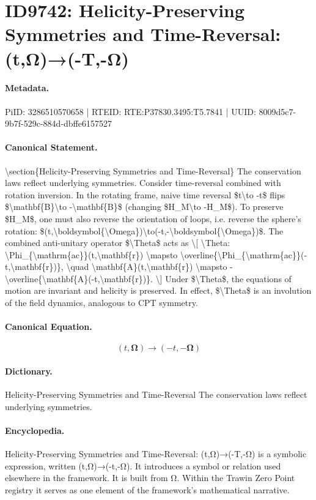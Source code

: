 \section*{ID9742: Helicity-Preserving Symmetries and Time-Reversal: (t,Ω)→(-T,-Ω)}
\paragraph{Metadata.}
PiID: 3286510570658 | RTEID: RTE:P37830.3495:T5.7841 | UUID: 8009d5c7-9b7f-529c-884d-dbffe6157527

\paragraph{Canonical Statement.}
\textbackslash{}section\{Helicity-Preserving Symmetries and Time-Reversal\} The conservation laws reflect underlying symmetries. Consider time-reversal combined with rotation inversion. In the rotating frame, naive time reversal \$t\textbackslash{}to -t\$ flips \$\textbackslash{}mathbf\{B\}\textbackslash{}to -\textbackslash{}mathbf\{B\}\$ (changing \$H\_M\textbackslash{}to -H\_M\$). To preserve \$H\_M\$, one must also reverse the orientation of loops, i.e. reverse the sphere's rotation: \$(t,\textbackslash{}boldsymbol\{\textbackslash{}Omega\})\textbackslash{}to(-t,-\textbackslash{}boldsymbol\{\textbackslash{}Omega\})\$. The combined anti-unitary operator \$\textbackslash{}Theta\$ acts as \textbackslash{}[ \textbackslash{}Theta: \textbackslash{}Phi\_\{\textbackslash{}mathrm\{ac\}\}(t,\textbackslash{}mathbf\{r\}) \textbackslash{}mapsto \textbackslash{}overline\{\textbackslash{}Phi\_\{\textbackslash{}mathrm\{ac\}\}(-t,\textbackslash{}mathbf\{r\})\}, \textbackslash{}quad \textbackslash{}mathbf\{A\}(t,\textbackslash{}mathbf\{r\}) \textbackslash{}mapsto -\textbackslash{}overline\{\textbackslash{}mathbf\{A\}(-t,\textbackslash{}mathbf\{r\})\}. \textbackslash{}] Under \$\textbackslash{}Theta\$, the equations of motion are invariant and helicity is preserved. In effect, \$\textbackslash{}Theta\$ is an involution of the field dynamics, analogous to CPT symmetry.

\paragraph{Canonical Equation.}
\[
(t,\boldsymbol{\Omega})\to(-t,-\boldsymbol{\Omega})
\]

\paragraph{Dictionary.}
Helicity-Preserving Symmetries and Time-Reversal The conservation laws reflect underlying symmetries.

\paragraph{Encyclopedia.}
Helicity-Preserving Symmetries and Time-Reversal: (t,Ω)→(-T,-Ω) is a symbolic expression, written (t,Ω)→(-t,-Ω). It introduces a symbol or relation used elsewhere in the framework. It is built from Ω. Within the Trawin Zero Point registry it serves as one element of the framework's mathematical narrative.
